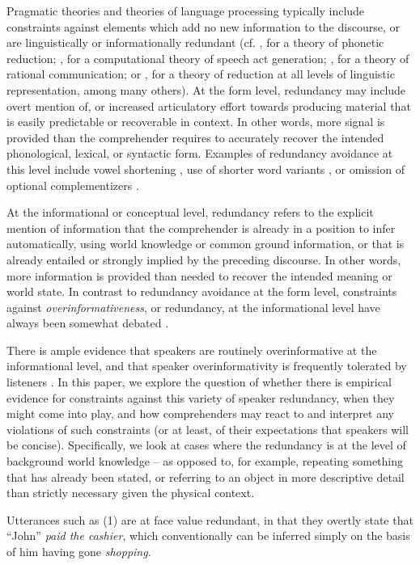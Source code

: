 Pragmatic theories and theories of language processing typically include
constraints against elements which add no new information to the
discourse, or are linguistically or informationally redundant (cf.
\citealp{Aylett2004}, for a theory of phonetic reduction; \citealp{Cohen1978},
for a computational theory of speech act generation; \citealp{Grice1975}, for a
theory of rational communication; or \citealp{Jaeger2010}, for a theory of
reduction at all levels of linguistic representation, among many
others). At the form level, redundancy may include overt mention of, or
increased articulatory effort towards producing material that is easily
predictable or recoverable in context. In other words, more signal is
provided than the comprehender requires to accurately recover the
intended phonological, lexical, or syntactic form. Examples of
redundancy avoidance at this level include vowel shortening \citep{Aylett2004}, use of shorter word variants \citep{Mahowald2013}, or omission of optional complementizers
\citep{Jaeger2010}.

At the informational or conceptual level, redundancy refers to the
explicit mention of information that the comprehender is already in a
position to infer automatically, using world knowledge or common ground
information, or that is already entailed or strongly implied by the
preceding discourse. In other words, more information is provided than
needed to recover the intended meaning or world state. In contrast to
redundancy avoidance at the form level, constraints against
\emph{overinformativeness}, or redundancy, at the informational level
have always been somewhat debated \citep{Grice1975}.

There is ample evidence that speakers are routinely overinformative at
the informational level, and that speaker overinformativity is
frequently tolerated by listeners \citep{Baker2008,
Engelhardt2006, Nadig2002, Walker1993}. In this paper, we explore the question of whether there is
empirical evidence for constraints against this variety of speaker
redundancy, when they might come into play, and how comprehenders may
react to and interpret any violations of such constraints (or at least,
of their expectations that speakers will be concise). Specifically, we
look at cases where the redundancy is at the level of background world
knowledge -- as opposed to, for example, repeating something that has
already been stated, or referring to an object in more descriptive
detail than strictly necessary given the physical context.

Utterances such as (1) are at face value redundant, in that they overtly
state that \enquote{John} \emph{paid the cashier}, which conventionally
can be inferred simply on the basis of him having gone \emph{shopping}.

